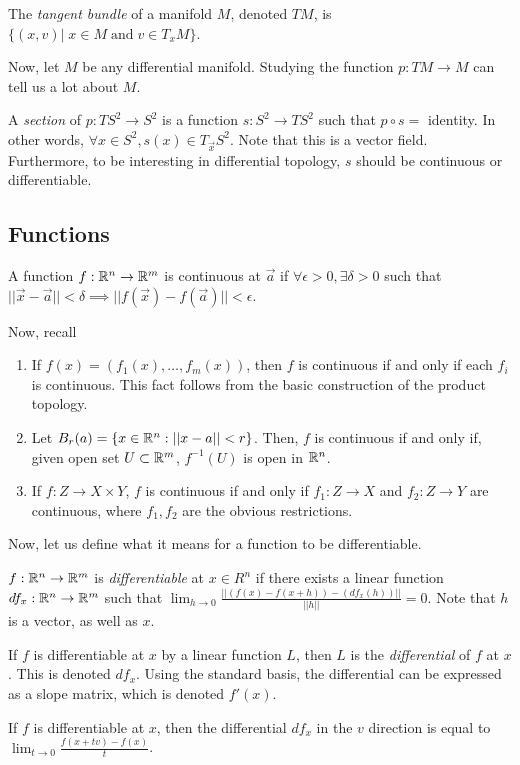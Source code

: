 \documentclass[11pt,leqno,oneside]{amsart}
\begin{document}
\begin{defn}
	The \emph{tangent bundle} of a manifold $M$, denoted $TM$, is $\{ (x,v) |\; x \in M \;\text{and}\; v \in T_xM \}$.
\end{defn}

Now, let $M$ be any differential manifold. Studying the function $p: TM \to M$
can tell us a lot about $M$.

\begin{example}
	A \emph{section} of $p: TS^2 \to S^2$ is a function $s: S^2 \to TS^2$ such
	that $p \circ s =$ identity. In other words, $\forall x \in S^2, s(x) \in
	T_{\vec{x}}S^2$. Note that this is a vector field. Furthermore, to be
	interesting in differential topology, $s$ should be continuous or
	differentiable.
\end{example}



\subsection{Functions}

\begin{defn}
	A function $f: {\mathbb R}^n \to {\mathbb R}^m$ is continuous at $\vec{a}$ if $\forall
	\epsilon > 0, \exists \delta > 0$ such that $||\vec{x}-\vec{a}|| < \delta
	\implies ||f(\vec{x}) - f(\vec{a})|| < \epsilon$.
\end{defn}
Now, recall \begin{enumerate}
	\item If $f(x) = (f_1(x), \ldots, f_m(x))$, then $f$ is continuous if and
		only if each $f_i$ is continuous. This fact follows from the basic
		construction of the product topology.
	\item Let $B_r(a) = \{x \in {\mathbb R}^n : ||x-a|| < r\}$. Then, $f$ is continuous
		if and only if, given open set $U \subset {\mathbb R}^m$, $f^{-1}(U)$ is open in
		${\mathbb R}^n$.
	\item If $f: Z \to X \times Y$, $f$ is continuous if and only if $f_1: Z
		\to X$ and $f_2: Z \to Y$ are continuous, where $f_1, f_2$ are the
		obvious restrictions.
\end{enumerate}

Now, let us define what it means for a function to be differentiable.
\begin{defn}
	$f :{\mathbb R}^n \to {\mathbb R}^m$ is \emph{differentiable} at $x \in R^n$ if there exists a linear function $df_x : {\mathbb R}^n \to {\mathbb R}^m$  such that $\lim_{h \to 0} \frac{|| (f(x)-f(x+h)) - (df_x(h)) ||}{||h||} = 0$.  Note that $h$ is a vector, as well as $x$.
\end{defn}
\begin{defn}
	If $f$ is differentiable at $x$ by a linear function $L$, then $L$ is the \emph{differential} of $f$ at $x$.  This is denoted $df_x$.  Using the standard basis, the differential can be expressed as a slope matrix, which is denoted $f'(x)$.
\end{defn}
\begin{thm}
	If $f$ is differentiable at $x$, then the differential $df_x$ in the $v$ direction is equal to $\lim_{t \to 0} \frac{f(x+tv) - f(x)}{t}$.
\end{thm}
\end{document}
